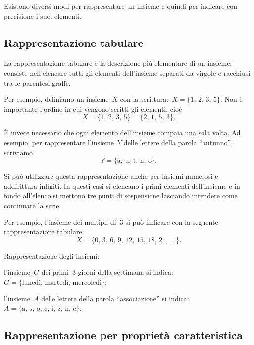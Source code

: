 Esistono diversi modi per rappresentare un insieme e quindi per indicare
con precisione i suoi elementi.

\subsection{Rappresentazione tabulare}

La rappresentazione tabulare è la descrizione più elementare di un
insieme; consiste nell'elencare tutti gli elementi dell'insieme separati da virgole e racchiusi tra le
parentesi graffe.

Per esempio, definiamo un insieme~$X$ con la scrittura:~$X=\{\text{1, 2, 3, 5}\}$.
Non è importante l'ordine in cui vengono scritti gli elementi, cioè
\[X=\{\text{1, 2, 3, 5}\}=\{\text{2, 1, 5, 3}\}.\]

È invece necessario che ogni elemento dell'insieme compaia una sola volta. Ad esempio, per rappresentare
l'insieme~$Y$ delle lettere della parola ``autunno'', scriviamo
\[Y = \{\text{a, u, t, n, o}\}.\]

Si può utilizzare questa rappresentazione anche per insiemi numerosi e addirittura infiniti. In questi casi si elencano i primi elementi
dell'insieme e in fondo all'elenco si mettono tre punti di sospensione lasciando intendere come continuare la serie.

Per esempio, l'insieme dei multipli di~3 si può indicare con la seguente rappresentazione tabulare:
\[X=\{\text{0, 3, 6, 9, 12, 15, 18, 21, }\ldots\}.\]


\begin{exrig}
 \begin{esempio}
Rappresentazione degli insiemi:
 \begin{enumeratea}
\item l'insieme~$G$ dei primi~3 giorni della settimana si indica:~$G=\{\text{lunedì, martedì, mercoledì}\}$;
\item l'insieme~$A$ delle lettere della parola ``associazione'' si indica:~$A=\{\text{a, s, o, c, i, z, n, e}\}$.
\end{enumeratea}
 \end{esempio}
\end{exrig}

\ovalbox{\risolvii \ref{ese:\thechapter.15}, \ref{ese:\thechapter.16}, \ref{ese:\thechapter.17}, \ref{ese:\thechapter.18}}

\subsection{Rappresentazione per proprietà caratteristica}

